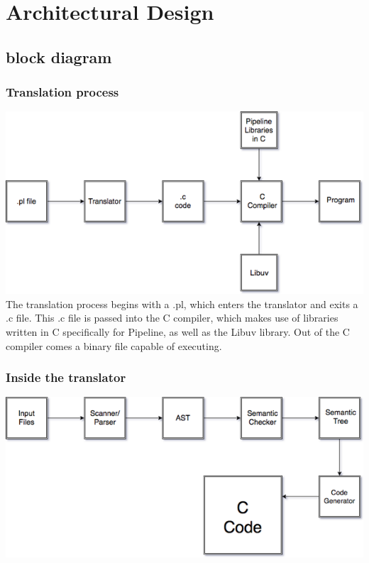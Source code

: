 \documentclass[./Report_main.tex]{subfiles}
\begin{document}


\chapter{Architectural Design}
\section{block diagram}
\subsection{Translation process}
\includegraphics[scale = 0.5]{block_1.png}\\

The translation process begins with a .pl, which enters the translator and exits a .c file. This .c file is passed into the C compiler, which makes use of libraries written in C specifically for
Pipeline, as well as the Libuv library. Out of the C compiler comes a binary file capable of executing.
\subsection{Inside the translator}
\includegraphics[scale = 0.5]{block_2.png}\\
\end{document}
